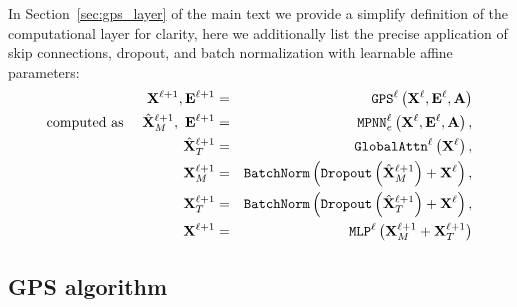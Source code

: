 \documentclass{article}
\begin{document}
\newcommand{\drp}{\texttt{Dropout}\xspace}
\newcommand{\bn}{\texttt{BatchNorm}\xspace}
 In Section~\ref{sec:gps_layer} of the main text we provide a simplify definition of the \method computational layer for clarity, here we additionally list the precise application of skip connections, dropout, and batch normalization with learnable affine parameters:
\begin{eqnarray}
    \X^{\ell+1}, \E^{\ell+1} &=& \texttt{GPS}^{\ell} \left( \X^{\ell}, \E^{\ell}, \A \right)\\
    \textrm{computed as} \ \ \ \ 
    \hat\X^{\ell+1}_M, \ \E^{\ell+1} &=& \mpnn_e^{\ell} \left(\X^{\ell}, \E^{\ell}, \A \right),\\
    \hat\X^{\ell+1}_T &=&  \attn^{\ell} \left(\X^{\ell}  \right),\\
    \X^{\ell+1}_M   &=& \bn \left( \drp \left( \hat\X^{\ell+1}_M \right) + \X^{\ell} \right), \\
    \X^{\ell+1}_T   &=& \bn \left( \drp \left( \hat\X^{\ell+1}_T \right) + \X^{\ell} \right), \\
    \X^{\ell+1}     &=& \texttt{MLP}^{\ell}\left(\X^{\ell+1}_M + \X^{\ell+1}_T\right)
\end{eqnarray}



\newpage
\subsection{GPS algorithm}

\newcommand{\nodeenc}{\texttt{NodeEncoder}\xspace}
\newcommand{\edgeenc}{\texttt{EdgeEncoder}\xspace}
\end{document}
